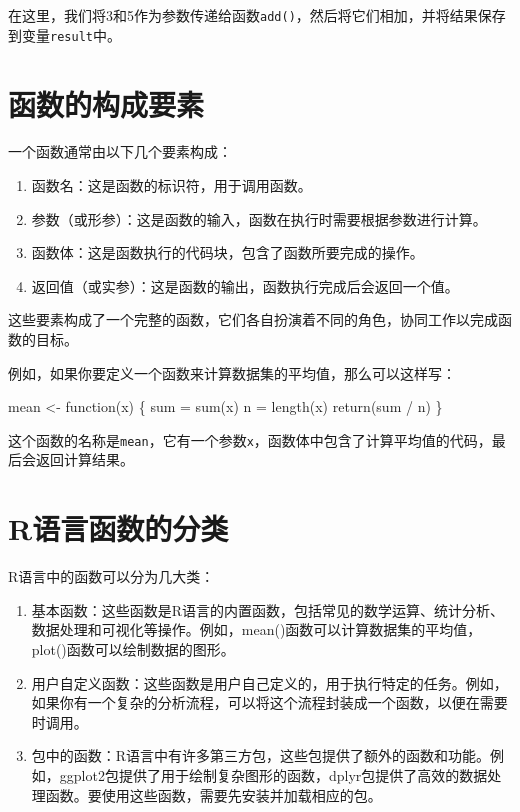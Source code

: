 \documentclass[
  letterpaper,
  DIV=11,
  numbers=noendperiod]{scrreprt}
\newenvironment{Shaded}{\begin{snugshade}}{\end{snugshade}}
\newcommand{\ControlFlowTok}[1]{\textcolor[rgb]{0.00,0.23,0.31}{#1}}
\newcommand{\FunctionTok}[1]{\textcolor[rgb]{0.28,0.35,0.67}{#1}}
\newcommand{\NormalTok}[1]{\textcolor[rgb]{0.00,0.23,0.31}{#1}}
\newcommand{\OtherTok}[1]{\textcolor[rgb]{0.00,0.23,0.31}{#1}}
\newcommand{\SpecialCharTok}[1]{\textcolor[rgb]{0.37,0.37,0.37}{#1}}
\begin{document}
在这里，我们将3和5作为参数传递给函数\texttt{add()}，然后将它们相加，并将结果保存到变量\texttt{result}中。

\hypertarget{ux51fdux6570ux7684ux6784ux6210ux8981ux7d20}{%
\section{函数的构成要素}\label{ux51fdux6570ux7684ux6784ux6210ux8981ux7d20}}

一个函数通常由以下几个要素构成：

\begin{enumerate}
\def\labelenumi{\arabic{enumi}.}
\item
  函数名：这是函数的标识符，用于调用函数。
\item
  参数（或形参）：这是函数的输入，函数在执行时需要根据参数进行计算。
\item
  函数体：这是函数执行的代码块，包含了函数所要完成的操作。
\item
  返回值（或实参）：这是函数的输出，函数执行完成后会返回一个值。
\end{enumerate}

这些要素构成了一个完整的函数，它们各自扮演着不同的角色，协同工作以完成函数的目标。

例如，如果你要定义一个函数来计算数据集的平均值，那么可以这样写：

\begin{Shaded}
\begin{Highlighting}[]
\NormalTok{mean }\OtherTok{\textless{}{-}} \ControlFlowTok{function}\NormalTok{(x) \{}
\NormalTok{  sum }\OtherTok{=} \FunctionTok{sum}\NormalTok{(x)}
\NormalTok{  n }\OtherTok{=} \FunctionTok{length}\NormalTok{(x)}
  \FunctionTok{return}\NormalTok{(sum }\SpecialCharTok{/}\NormalTok{ n)}
\NormalTok{\}}
\end{Highlighting}
\end{Shaded}

这个函数的名称是\texttt{mean}，它有一个参数\texttt{x}，函数体中包含了计算平均值的代码，最后会返回计算结果。

\hypertarget{rux8bedux8a00ux51fdux6570ux7684ux5206ux7c7b}{%
\section{R语言函数的分类}\label{rux8bedux8a00ux51fdux6570ux7684ux5206ux7c7b}}

R语言中的函数可以分为几大类：

\begin{enumerate}
\def\labelenumi{\arabic{enumi}.}
\item
  基本函数：这些函数是R语言的内置函数，包括常见的数学运算、统计分析、数据处理和可视化等操作。例如，mean()函数可以计算数据集的平均值，plot()函数可以绘制数据的图形。
\item
  用户自定义函数：这些函数是用户自己定义的，用于执行特定的任务。例如，如果你有一个复杂的分析流程，可以将这个流程封装成一个函数，以便在需要时调用。
\item
  包中的函数：R语言中有许多第三方包，这些包提供了额外的函数和功能。例如，ggplot2包提供了用于绘制复杂图形的函数，dplyr包提供了高效的数据处理函数。要使用这些函数，需要先安装并加载相应的包。
\end{enumerate}
\end{document}
